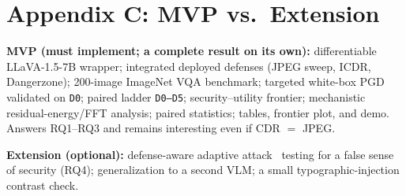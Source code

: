 \documentclass[11pt]{article}
\begin{document}
\section*{Appendix C: MVP vs.\ Extension}
\textbf{MVP (must implement; a complete result on its own):} differentiable
LLaVA-1.5-7B wrapper; integrated deployed defenses (JPEG sweep, ICDR,
Dangerzone); 200-image ImageNet VQA benchmark; targeted white-box PGD validated
on \texttt{D0}; paired ladder \texttt{D0--D5}; security--utility frontier;
mechanistic residual-energy/FFT analysis; paired statistics; tables, frontier
plot, and demo. Answers RQ1--RQ3 and remains interesting even if CDR $=$ JPEG.

\smallskip
\noindent\textbf{Extension (optional):} defense-aware adaptive
attack~\cite{athalye2018obfuscated} testing for a false sense of security (RQ4);
generalization to a second VLM; a small typographic-injection contrast check.

\printbibliography[title={References}]
\end{document}

